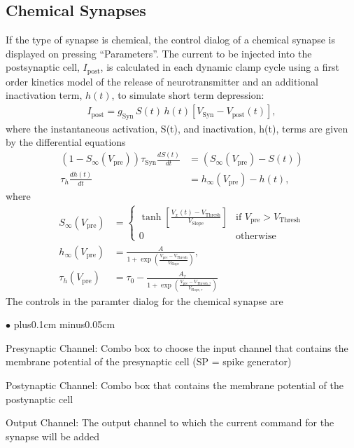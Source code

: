 \documentclass{article}
\newenvironment{myitem}{\begin{list}{$\bullet$}{\setlength{\leftmargin}{1.1em}
\itemsep0.1cm plus0.1cm minus0.05cm
\listparindent0cm
\addtolength{\labelsep}{0.5\labelsep}
\setlength{\labelwidth}{0.8em}
\setlength{\leftmargin}{\labelwidth}
\addtolength{\leftmargin}{\labelsep}
}}{\end{list}}
\begin{document}
\subsection{Chemical Synapses}
If the type of synapse is chemical, the control dialog of a chemical
synapse is displayed on pressing ``Parameters''. The current to be
injected into the postsynaptic cell, $I_{\text{post}}$, is calculated
in each dynamic clamp cycle using a first order kinetics model of the
release of neurotransmitter \cite{Destexhe1994} and an additional
inactivation term, $h(t)$, to simulate short term depression:
\begin{align}
  I_{\text{post}} = g_{\text{Syn}} \, S(t) \, h(t) [V_{\text{Syn}} -
    V_{\text{post}}(t)],
\end{align}
where the instantaneous activation, S(t), and inactivation, h(t), terms are
given by the differential equations
\begin{align}
(1-S_\infty(V_{\text{pre}})) \tau_{\text{Syn}} \frac{dS(t)}{dt} &=
(S_\infty(V_{\text{pre}}) - S(t)) \\ \tau_h \frac{dh(t)}{dt} &=
h_\infty(V_{\text{pre}}) - h(t),
\end{align}
where
\begin{align}
S_\infty(V_{\text{pre}}) &= \left\{
\begin{array}{ll}
  \tanh\left[\frac{V_x(t) - V_{\text{Thresh}}}{V_{\text{Slope}}}
    \right] & \text{if } V_{\text{pre}} > V_{\text{Thresh}} \\ 0 &
  \text{otherwise}
  \end{array}
\right. \\ 
%
h_\infty(V_{\text{pre}})&=
\frac{A}{1+\exp\left(\frac{V_{\text{pre}} -
    V_{\text{Thresh}}}{V_{\text{Slope}}}\right)}, \\  
\tau_h(V_{\text{pre}})&= \tau_{0} -
\frac{A_\tau}{1+\exp\left(\frac{V_{\text{pre}} -
    V_{\text{Thresh},\tau}}{V_{\text{Slope},\tau}} \right)}
\end{align}                                              
  The controls in the paramter dialog for the chemical synapse are
  \begin{myitem}
  \item Presynaptic Channel: Combo box to choose the input channel
    that contains the membrane potential of the presynaptic cell (SP = spike
    generator) 
  \item Postynaptic Channel: Combo box that contains the membrane
    potential of the postynaptic cell
\item Output Channel: The output channel to which the current command
  for the synapse will be added
\end{myitem}
\end{document}
